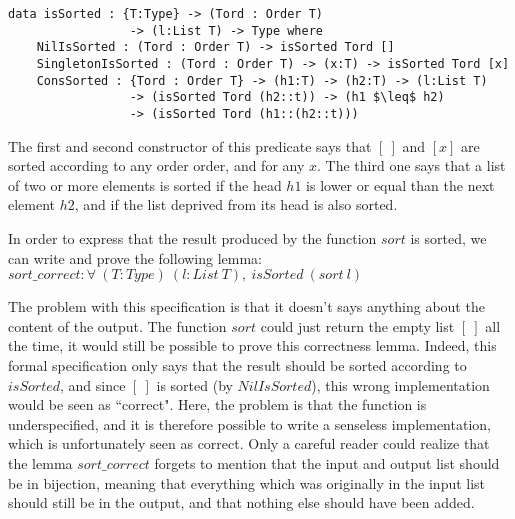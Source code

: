 \begin{lstlisting}
data isSorted : {T:Type} -> (Tord : Order T) 
                 -> (l:List T) -> Type where
    NilIsSorted : (Tord : Order T) -> isSorted Tord []
    SingletonIsSorted : (Tord : Order T) -> (x:T) -> isSorted Tord [x]
    ConsSorted : {Tord : Order T} -> (h1:T) -> (h2:T) -> (l:List T) 
                 -> (isSorted Tord (h2::t)) -> (h1 $\leq$ h2) 
                 -> (isSorted Tord (h1::(h2::t)))
\end{lstlisting}

The first and second constructor of this predicate says that $[\ ]$ and $[x]$ are sorted according to any order order, and for any $x$. The third one says that a list of two or more elements is sorted if the head $h1$ is lower or equal than the next element $h2$, and if the list deprived from its head is also sorted.

In order to express that the result produced by the function $sort$ is sorted, we can write and prove the following lemma:
$sort\_correct : \forall\ (T:Type)\ (l:List\ T),\ isSorted\ (sort\ l)$

The problem with this specification is that it doesn't says anything about the content of the output. The function $sort$ could just return the empty list $[\ ]$ all the time, it would still be possible to prove this correctness lemma. Indeed, this formal specification only says that the result should be sorted according to $isSorted$, and since $[\ ]$ is sorted (by $NilIsSorted$), this wrong implementation would be seen as ``correct". Here, the problem is that the function is underspecified, and it is therefore possible to write a senseless implementation, which is unfortunately seen as correct. Only a careful reader could realize that the lemma $sort\_correct$ forgets to mention that the input and output list should be in bijection, meaning that everything which was originally in the input list should still be in the output, and that nothing else should have been added.

